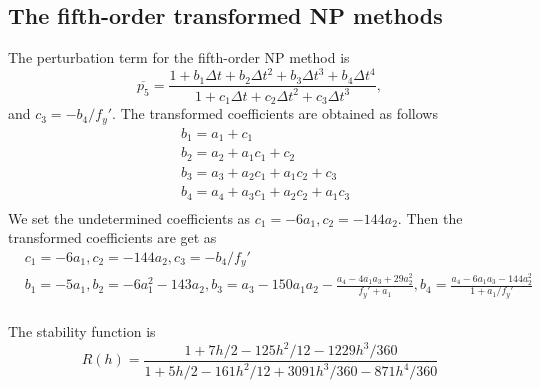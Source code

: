 \documentclass[review]{elsarticle}
\theoremstyle{plain}\newtheorem{definition}{\sc{Definition}}
\theoremstyle{defination}\newtheorem{example}{Example}[section]
\numberwithin{equation}{section}
\numberwithin{table}{section}
\begin{document}
{	\subsection{The fifth-order transformed NP methods}
The perturbation term for the fifth-order NP method is
\begin{equation}
  \overline{p_5} = \frac{1+b_1 \Delta t + b_2 \Delta t^2 +b_3\Delta t^3 +b_4\Delta t^4 }{1+c_1 \Delta t+c_2 \Delta t^2 +c_3 \Delta t^3},
  \end{equation}
  and $c_3=-b_4 /f_y'$.
The transformed coefficients are obtained as follows
\begin{equation}
  \begin{aligned}
  &b_1=a_1+c_1\\
  &b_2=a_2+a_1c_1+c_2\\
  &b_3=a_3+a_2c_1+a_1c_2+c_3\\
  &b_4=a_4+a_3c_1+a_2c_2+a_1c_3\\
  \end{aligned}
 \end{equation}
We set the undetermined coefficients  as $c_1= -6a_1, c_2=-144a_2$. Then the transformed coefficients are get as
\begin{equation}
  \begin{aligned}
	&c_1=-6a_1, c_2=-144a_2, c_3=-b_4/f_y'\\
	&b_1=-5a_1, b_2=-6a_1^2-143a_2,  b_3=a_3-150a_1a_2- \frac{a_4-4a_1a_3+29a_2^2}{f_y'+a_1} ,b_4=\frac{a_4-6a_1a_3-144a_2^2}{1+a_1/f_y'}  \\
	\end{aligned}
	\end{equation}



The stability function is
 \begin{equation}
   R(h)=\frac{1+7h/2-125h^2/12-1229h^3/360}{1+5h/2-161h^2/12+3091h^3/360-871h^4/360}
   \end{equation}
}
\end{document}

